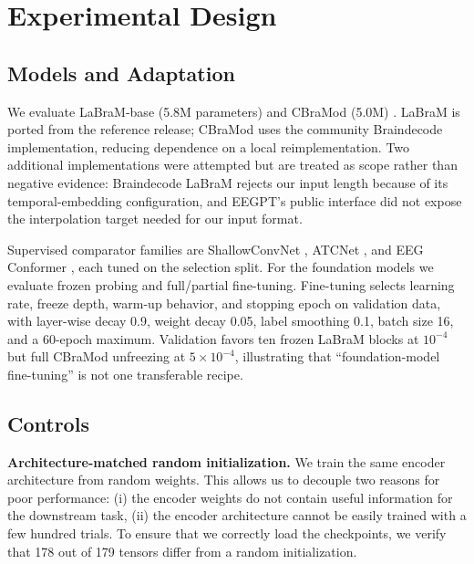 \documentclass[conference]{IEEEtran}
\begin{document}
\section{Experimental Design}

\subsection{Models and Adaptation}

We evaluate LaBraM-base (5.8M parameters) \cite{jiang2024labram} and CBraMod (5.0M) \cite{wang2025cbramod}. LaBraM is ported from the reference release; CBraMod uses the community Braindecode implementation, reducing dependence on a local reimplementation. Two additional implementations were attempted but are treated as scope rather than negative evidence: Braindecode LaBraM rejects our input length because of its temporal-embedding configuration, and EEGPT's public interface did not expose the interpolation target needed for our input format.

Supervised comparator families are ShallowConvNet \cite{schirrmeister2017deep}, ATCNet \cite{altaheri2023atcnet}, and EEG Conformer \cite{song2023conformer}, each tuned on the selection split. For the foundation models we evaluate frozen probing and full/partial fine-tuning. Fine-tuning selects learning rate, freeze depth, warm-up behavior, and stopping epoch on validation data, with layer-wise decay 0.9, weight decay 0.05, label smoothing 0.1, batch size 16, and a 60-epoch maximum. Validation favors ten frozen LaBraM blocks at $10^{-4}$ but full CBraMod unfreezing at $5\times10^{-4}$, illustrating that ``foundation-model fine-tuning'' is not one transferable recipe.

\subsection{Controls}

\textbf{Architecture-matched random initialization.}
We train the same encoder architecture from random weights. This allows us to decouple two reasons for poor performance: (i) the encoder weights do not contain useful information for the downstream task, (ii) the encoder architecture cannot be easily trained with a few hundred trials. To ensure that we correctly load the checkpoints, we verify that 178 out of 179 tensors differ from a random initialization.
\end{document}
